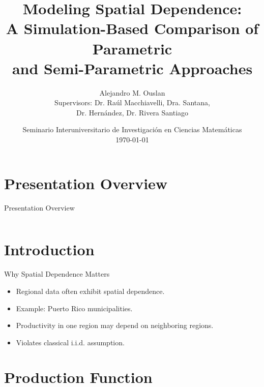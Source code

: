 \documentclass[11pt]{beamer}
\title{Modeling Spatial Dependence:\\
A Simulation-Based Comparison of Parametric\\
and Semi-Parametric Approaches}
\author[Ouslan]{\small{
Alejandro M. Ouslan}\\
{\tiny
Supervisors: Dr. Raúl Macchiavelli, Dra. Santana,\\
Dr. Hernández, Dr. Rivera Santiago}
}
\institute[UPRM]{University of Puerto Rico, Mayagüez}
\date[\today]{\small{Seminario Interuniversitario de Investigación en Ciencias Matemáticas}\\
\vspace{2mm}
\footnotesize{\today}}
\begin{document}
{
\begin{frame}
	\titlepage
\end{frame}
}


\section*{Presentation Overview}
\begin{frame}{Presentation Overview}

	\begin{columns}[T,onlytextwidth]
		\tableofcontents[sections={1-3}]

		\tableofcontents[sections={4-6}]
	\end{columns}

\end{frame}

\section{Introduction}

\begin{frame}{Why Spatial Dependence Matters}

	\begin{itemize}
		\item Regional data often exhibit spatial dependence.
		\item Example: Puerto Rico municipalities.
		\item Productivity in one region may depend on neighboring regions.
		\item Violates classical i.i.d. assumption.
	\end{itemize}

\end{frame}

\section{Production Function}
\end{document}
